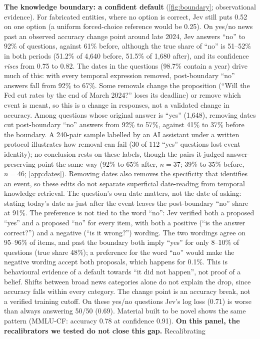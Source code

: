 \documentclass[10pt,twocolumn]{article}
\begin{document}
\textbf{The knowledge boundary: a confident default} (\cref{fig:boundary};
observational evidence). For fabricated entities, where no option is
correct, Jev still puts 0.52 on one option (a uniform forced-choice reference
would be 0.25). On yes/no
news past an observed accuracy change point around late 2024, Jev answers
``no'' to 92\% of questions, against 61\% before, although the true share of
``no'' is 51--52\% in both periods (51.2\% of 4{,}640 before, 51.5\% of
1{,}680 after), and its confidence \emph{rises} from 0.75
to 0.82. The dates in the questions (98.7\% contain a year) drive much of
this: with every temporal expression removed, post-boundary ``no'' answers fall
from 92\% to 67\%. Some removals change the proposition (``Will the Fed cut
rates by the end of March 2024?'' loses its deadline) or remove which event is
meant, so this is a change in responses, not a validated change in accuracy.
Among questions whose original answer is ``yes'' (1{,}648), removing dates cut
post-boundary ``no'' answers from 92\% to 57\%, against 41\% to 37\% before
the boundary. A 240-pair sample labelled by an AI assistant under a written
protocol illustrates how removal can fail (30 of 112 ``yes'' questions lost
event identity); no conclusion rests on these labels, though the pairs it
judged answer-preserving point the same way (92\% to 65\% after, $n=37$;
39\% to 35\% before, $n=46$; \cref{app:dates}). Removing dates also removes the
specificity that identifies an event, so these edits do not separate
superficial date-reading from temporal knowledge retrieval. The question's own date matters, not the
date of asking: stating today's date as just after the event leaves the
post-boundary ``no'' share at 91\%. The preference is not tied to the word
``no'': Jev verified both a proposed ``yes'' and a proposed ``no'' for every
item, with both a positive (``is the answer correct?'') and a negative (``is it
wrong?'') wording. The two wordings agree on 95--96\% of items, and past the
boundary both imply ``yes'' for only 8--10\% of questions (true share 48\%); a
preference for the word ``no'' would make the negative wording accept both
proposals, which happens for 0.1\%. This is behavioural evidence of a default
towards ``it did not happen'', not proof of a belief. Shifts between broad news categories alone do
not explain the drop, since accuracy falls within every category. The change point is an accuracy break, not a verified training
cutoff. On these yes/no questions Jev's log loss (0.71) is worse than always
answering 50/50 (0.69). Material built to be novel shows the
same pattern (MMLU-CF: accuracy 0.78 at confidence 0.91). \textbf{On this
panel, the recalibrators we tested do not close this gap.} Recalibrating
\end{document}

